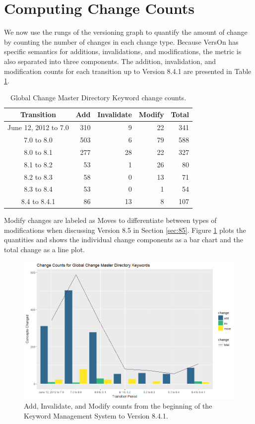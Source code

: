 \section{Computing Change Counts}

We now use the rungs of the versioning graph to quantify the amount of change by counting the number of changes in each change type.
Because VersOn has specific semantics for additions, invalidations, and modifications, the metric is also separated into three components.
The addition, invalidation, and modification counts for each transition up to Version 8.4.1 are presented in Table \ref{table:GCMD_main}.
\begin{table}
	\caption{Global Change Master Directory Keyword change counts.}
	\label{table:GCMD_main}
	\centering
	\begin{tabular}{@{}crrrr@{}}
		\toprule
		Transition&	Add&	Invalidate&	Modify&	Total\\
		\midrule
		June 12, 2012 to 7.0&	310&	9&	22&	341\\
		7.0 to 8.0&	503&	6&	79&	588\\
		8.0 to 8.1&	277&	28&	22&	327\\
		8.1 to 8.2&	53&	1&	26&	80\\
		8.2 to 8.3&	58&	0&	13&	71\\
		8.3 to 8.4&	53&	0&	1&	54\\
		8.4 to 8.4.1&	86&	13&	8&	107\\
		\bottomrule
	\end{tabular}
\end{table}
Modify changes are labeled as Moves to differentiate between types of modifications when discussing Version 8.5 in Section \ref{sec:85}.
Figure \ref{GCMDC1} plots the quantities and shows the individual change components as a bar chart and the total change as a line plot.
\begin{figure}[b]
	\centering
	\includegraphics[scale=0.65]{GCMDChartShort_R.png}
	\caption{Add, Invalidate, and Modify counts from the beginning of the Keyword Management System to Version 8.4.1.}
	\label{GCMDC1}
\end{figure}
